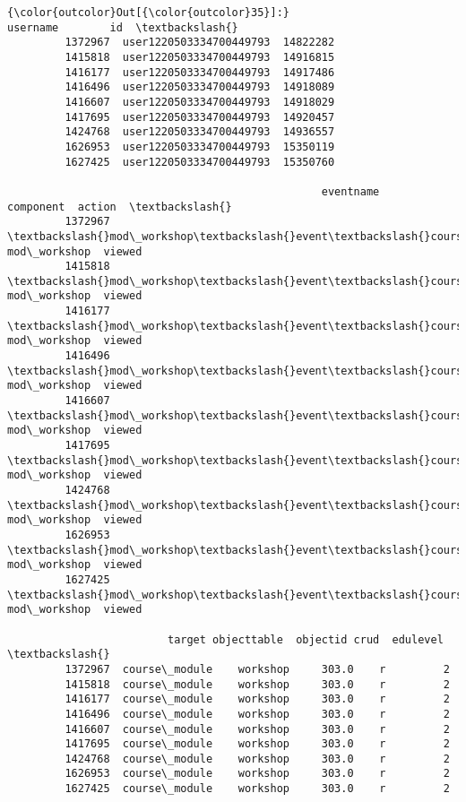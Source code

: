 \documentclass[11pt]{article}
\begin{document}
\begin{Verbatim}[commandchars=\\\{\}]
{\color{outcolor}Out[{\color{outcolor}35}]:}                         username        id  \textbackslash{}
         1372967  user1220503334700449793  14822282   
         1415818  user1220503334700449793  14916815   
         1416177  user1220503334700449793  14917486   
         1416496  user1220503334700449793  14918089   
         1416607  user1220503334700449793  14918029   
         1417695  user1220503334700449793  14920457   
         1424768  user1220503334700449793  14936557   
         1626953  user1220503334700449793  15350119   
         1627425  user1220503334700449793  15350760   
         
                                                 eventname     component  action  \textbackslash{}
         1372967  \textbackslash{}mod\_workshop\textbackslash{}event\textbackslash{}course\_module\_viewed  mod\_workshop  viewed   
         1415818  \textbackslash{}mod\_workshop\textbackslash{}event\textbackslash{}course\_module\_viewed  mod\_workshop  viewed   
         1416177  \textbackslash{}mod\_workshop\textbackslash{}event\textbackslash{}course\_module\_viewed  mod\_workshop  viewed   
         1416496  \textbackslash{}mod\_workshop\textbackslash{}event\textbackslash{}course\_module\_viewed  mod\_workshop  viewed   
         1416607  \textbackslash{}mod\_workshop\textbackslash{}event\textbackslash{}course\_module\_viewed  mod\_workshop  viewed   
         1417695  \textbackslash{}mod\_workshop\textbackslash{}event\textbackslash{}course\_module\_viewed  mod\_workshop  viewed   
         1424768  \textbackslash{}mod\_workshop\textbackslash{}event\textbackslash{}course\_module\_viewed  mod\_workshop  viewed   
         1626953  \textbackslash{}mod\_workshop\textbackslash{}event\textbackslash{}course\_module\_viewed  mod\_workshop  viewed   
         1627425  \textbackslash{}mod\_workshop\textbackslash{}event\textbackslash{}course\_module\_viewed  mod\_workshop  viewed   
         
                         target objecttable  objectid crud  edulevel  \textbackslash{}
         1372967  course\_module    workshop     303.0    r         2   
         1415818  course\_module    workshop     303.0    r         2   
         1416177  course\_module    workshop     303.0    r         2   
         1416496  course\_module    workshop     303.0    r         2   
         1416607  course\_module    workshop     303.0    r         2   
         1417695  course\_module    workshop     303.0    r         2   
         1424768  course\_module    workshop     303.0    r         2   
         1626953  course\_module    workshop     303.0    r         2   
         1627425  course\_module    workshop     303.0    r         2   
         

\end{Verbatim}
\end{document}
